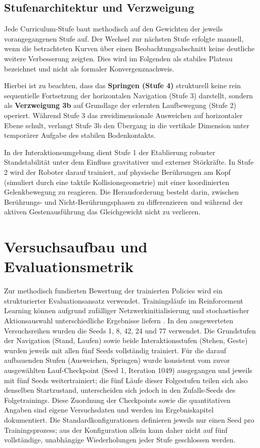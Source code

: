 \subsection{Stufenarchitektur und Verzweigung}
Jede Curriculum-Stufe baut methodisch auf den Gewichten der jeweils vorangegangenen Stufe auf. Der Wechsel zur nächsten Stufe erfolgte manuell, wenn die betrachteten Kurven über einen Beobachtungsabschnitt keine deutliche weitere Verbesserung zeigten. Dies wird im Folgenden als stabiles Plateau bezeichnet und nicht als formaler Konvergenznachweis.

Hierbei ist zu beachten, dass das \textbf{Springen (Stufe 4)} strukturell keine rein sequentielle Fortsetzung der horizontalen Navigation (Stufe 3) darstellt, sondern als \textbf{Verzweigung 3b} auf Grundlage der erlernten Laufbewegung (Stufe 2) operiert. Während Stufe 3 das zweidimensionale Ausweichen auf horizontaler Ebene schult, verlangt Stufe 3b den Übergang in die vertikale Dimension unter temporärer Aufgabe des stabilen Bodenkontakts.

In der Interaktionsumgebung dient Stufe 1 der Etablierung robuster Standstabilität unter dem Einfluss gravitativer und externer Störkräfte. In Stufe 2 wird der Roboter darauf trainiert, auf physische Berührungen am Kopf (simuliert durch eine taktile Kollisionsgeometrie) mit einer koordinierten Gelenkbewegung zu reagieren. Die Herausforderung besteht darin, zwischen Berührungs- und Nicht-Berührungsphasen zu differenzieren und während der aktiven Gestenausführung das Gleichgewicht nicht zu verlieren.

\section{Versuchsaufbau und Evaluationsmetrik}

Zur methodisch fundierten Bewertung der trainierten Policies wird ein strukturierter Evaluationsansatz verwendet. Trainingsläufe im Reinforcement Learning können aufgrund zufälliger Netzwerkinitialisierung und stochastischer Aktionsauswahl unterschiedliche Ergebnisse liefern \cite{hendersonDeepReinforcementLearning2019}. In den ausgewerteten Versuchsreihen wurden die Seeds 1, 8, 42, 24 und 77 verwendet. Die Grundstufen der Navigation (Stand, Laufen) sowie beide Interaktionsstufen (Stehen, Geste) wurden jeweils mit allen fünf Seeds vollständig trainiert. Für die darauf aufbauenden Stufen (Ausweichen, Springen) wurde konsistent vom zuvor ausgewählten Lauf-Checkpoint (Seed 1, Iteration 1049) ausgegangen und jeweils mit fünf Seeds weitertrainiert; die fünf Läufe dieser Folgestufen teilen sich also denselben Startzustand, unterscheiden sich jedoch in den Zufalls-Seeds des Folgetrainings. Diese Zuordnung der Checkpoints sowie die quantitativen Angaben sind eigene Versuchsdaten und werden im Ergebniskapitel dokumentiert. Die Standardkonfigurationen definieren jeweils nur einen Seed pro Trainingsprozess; aus der Konfiguration allein kann daher nicht auf fünf vollständige, unabhängige Wiederholungen jeder Stufe geschlossen werden.

